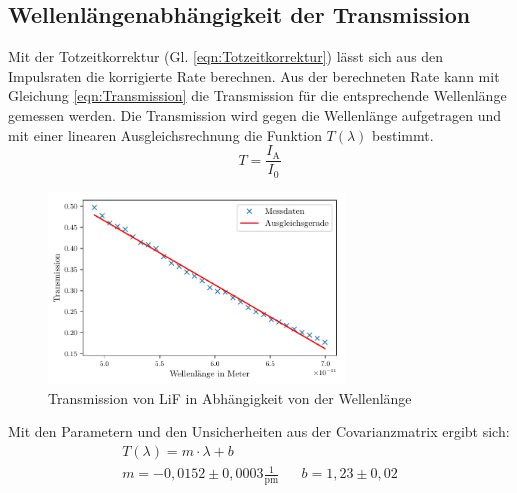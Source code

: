 \subsection{Wellenlängenabhängigkeit der Transmission}
Mit der Totzeitkorrektur (Gl. \ref{eqn:Totzeitkorrektur}) lässt sich aus den Impulsraten die korrigierte Rate berechnen.
Aus der berechneten Rate kann mit Gleichung \ref{eqn:Transmission} die Transmission für die entsprechende Wellenlänge gemessen werden.
Die Transmission wird gegen die Wellenlänge aufgetragen und mit einer linearen Ausgleichsrechnung die Funktion $T(\lambda)$ bestimmt.
\begin{equation}
    T = \frac{I_{\text{A}}}{I_0} \label{eqn:Transmission}
\end{equation}
\begin{figure}[H]
    \centering
    \includegraphics[width=0.7\textwidth]{plots/Transmission.pdf}
    \caption{Transmission von LiF in Abhängigkeit von der Wellenlänge}
    \label{fig:Transmission}
\end{figure}
Mit den Parametern und den Unsicherheiten aus der Covarianzmatrix ergibt sich:
\begin{align*}
    T(\lambda) = m \cdot \lambda + b  \\
    m = -0,0152 \pm 0,0003 \frac{1}{\text{pm}}&& b= 1,23 \pm 0,02 
\end{align*}

